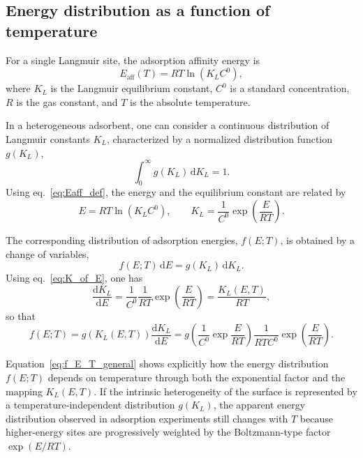 \documentclass[12pt]{article}
\begin{document}
	\subsection{Energy distribution as a function of temperature}
	
	For a single Langmuir site, the adsorption affinity energy is
	\begin{equation}
		E_{\mathrm{aff}}(T)
		= R T \ln\!\left(K_L C^0\right),
		\label{eq:Eaff_def}
	\end{equation}
	where \(K_L\) is the Langmuir equilibrium constant, \(C^0\) is a standard
	concentration, \(R\) is the gas constant, and \(T\) is the absolute
	temperature.
	
	In a heterogeneous adsorbent, one can consider a continuous distribution of
	Langmuir constants \(K_L\), characterized by a normalized distribution
	function \(g(K_L)\),
	\begin{equation}
		\int_{0}^{\infty} g(K_L)\, \mathrm{d}K_L = 1.
	\end{equation}
	Using eq.~\eqref{eq:Eaff_def}, the energy and the equilibrium constant are
	related by
	\begin{equation}
		E = R T \ln\!\left(K_L C^0\right),
		\qquad
		K_L = \frac{1}{C^0} \exp\!\left(\frac{E}{R T}\right).
		\label{eq:K_of_E}
	\end{equation}
	
	The corresponding distribution of adsorption energies, \(f(E;T)\), is
	obtained by a change of variables,
	\begin{equation}
		f(E;T)\, \mathrm{d}E = g(K_L)\, \mathrm{d}K_L.
	\end{equation}
	Using eq.~\eqref{eq:K_of_E}, one has
	\begin{equation}
		\frac{\mathrm{d}K_L}{\mathrm{d}E}
		= \frac{1}{C^0} \frac{1}{R T}
		\exp\!\left(\frac{E}{R T}\right)
		= \frac{K_L(E,T)}{R T},
	\end{equation}
	so that
	\begin{equation}
		f(E;T)
		= g\!\left(K_L(E,T)\right)
		\frac{\mathrm{d}K_L}{\mathrm{d}E}
		= g\!\left(\frac{1}{C^0} \exp\!\frac{E}{R T}\right)
		\frac{1}{R T C^0}
		\exp\!\left(\frac{E}{R T}\right).
		\label{eq:f_E_T_general}
	\end{equation}
	
	Equation~\eqref{eq:f_E_T_general} shows explicitly how the energy
	distribution \(f(E;T)\) depends on temperature through both the exponential
	factor and the mapping \(K_L(E,T)\). If the intrinsic heterogeneity of the
	surface is represented by a temperature-independent distribution \(g(K_L)\),
	the apparent energy distribution observed in adsorption experiments still
	changes with \(T\) because higher-energy sites are progressively weighted by
	the Boltzmann-type factor \(\exp(E / R T)\).
	
\end{document}
